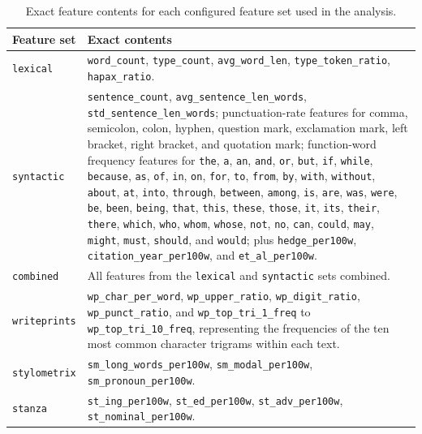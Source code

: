 \documentclass[12pt,a4paper]{article}
\begin{document}
\begin{table}[H]
\centering
\small
\begin{tabularx}{\textwidth}{>{\raggedright\arraybackslash}p{2.7cm} X}
\toprule
Feature set & Exact contents \\
\midrule
\texttt{lexical} & \texttt{word\_count}, \texttt{type\_count}, \texttt{avg\_word\_len}, \texttt{type\_token\_ratio}, \texttt{hapax\_ratio}. \\
\texttt{syntactic} & \texttt{sentence\_count}, \texttt{avg\_sentence\_len\_words}, \texttt{std\_sentence\_len\_words}; punctuation-rate features for comma, semicolon, colon, hyphen, question mark, exclamation mark, left bracket, right bracket, and quotation mark; function-word frequency features for \texttt{the}, \texttt{a}, \texttt{an}, \texttt{and}, \texttt{or}, \texttt{but}, \texttt{if}, \texttt{while}, \texttt{because}, \texttt{as}, \texttt{of}, \texttt{in}, \texttt{on}, \texttt{for}, \texttt{to}, \texttt{from}, \texttt{by}, \texttt{with}, \texttt{without}, \texttt{about}, \texttt{at}, \texttt{into}, \texttt{through}, \texttt{between}, \texttt{among}, \texttt{is}, \texttt{are}, \texttt{was}, \texttt{were}, \texttt{be}, \texttt{been}, \texttt{being}, \texttt{that}, \texttt{this}, \texttt{these}, \texttt{those}, \texttt{it}, \texttt{its}, \texttt{their}, \texttt{there}, \texttt{which}, \texttt{who}, \texttt{whom}, \texttt{whose}, \texttt{not}, \texttt{no}, \texttt{can}, \texttt{could}, \texttt{may}, \texttt{might}, \texttt{must}, \texttt{should}, and \texttt{would}; plus \texttt{hedge\_per100w}, \texttt{citation\_year\_per100w}, and \texttt{et\_al\_per100w}. \\
\texttt{combined} & All features from the \texttt{lexical} and \texttt{syntactic} sets combined. \\
\texttt{writeprints} & \texttt{wp\_char\_per\_word}, \texttt{wp\_upper\_ratio}, \texttt{wp\_digit\_ratio}, \texttt{wp\_punct\_ratio}, and \texttt{wp\_top\_tri\_1\_freq} to \texttt{wp\_top\_tri\_10\_freq}, representing the frequencies of the ten most common character trigrams within each text. \\
\texttt{stylometrix} & \texttt{sm\_long\_words\_per100w}, \texttt{sm\_modal\_per100w}, \texttt{sm\_pronoun\_per100w}. \\
\texttt{stanza} & \texttt{st\_ing\_per100w}, \texttt{st\_ed\_per100w}, \texttt{st\_adv\_per100w}, \texttt{st\_nominal\_per100w}. \\
\bottomrule
\end{tabularx}
\caption{Exact feature contents for each configured feature set used in the analysis.}
\label{tab:feature-set-inventory}
\end{table}
\end{document}
